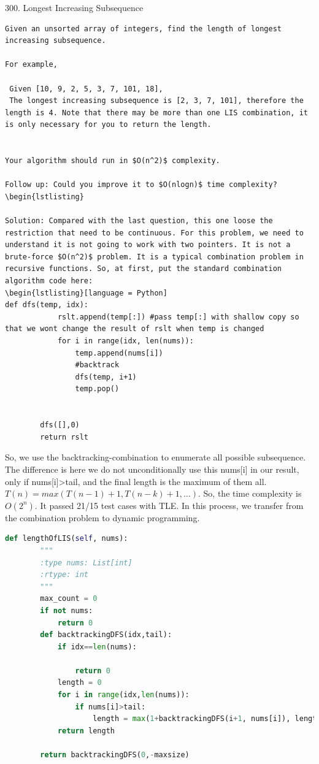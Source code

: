 \documentclass[../specific-algorithms.tex]{subfiles}
\begin{document}
300. Longest Increasing Subsequence
\begin{lstlisting}
Given an unsorted array of integers, find the length of longest increasing subsequence.

For example,

 Given [10, 9, 2, 5, 3, 7, 101, 18],
 The longest increasing subsequence is [2, 3, 7, 101], therefore the length is 4. Note that there may be more than one LIS combination, it is only necessary for you to return the length.


Your algorithm should run in $O(n^2)$ complexity.

Follow up: Could you improve it to $O(nlogn)$ time complexity?
\begin{lstlisting}

Solution: Compared with the last question, this one loose the restriction that need to be continuous. For this problem, we need to understand it is not going to work with two pointers. It is not a brute-force $O(n^2)$ problem. It is a typical combination problem in recursive functions. So, at first, put the standard combination algorithm code here:
\begin{lstlisting}[language = Python]
def dfs(temp, idx):
            rslt.append(temp[:]) #pass temp[:] with shallow copy so that we wont change the result of rslt when temp is changed
            for i in range(idx, len(nums)):
                temp.append(nums[i])
                #backtrack
                dfs(temp, i+1)
                temp.pop()
                
                
        dfs([],0)
        return rslt
\end{lstlisting}

So, we use the backtracking-combination to enumerate all possible subsequence. The difference is here we do not unconditionally use this nums[i] in our result, only if nums[i]>tail, and the final length is the maximum of them all. $T(n) = max(T(n-1)+1, T(n-k)+1, …)$. So, the time complexity is $O(2^n)$. It passed 21/15 test cases with TLE. In this process, we transfer from the combination problem to dynamic programming.
\begin{lstlisting}[language = Python]
def lengthOfLIS(self, nums):
        """
        :type nums: List[int]
        :rtype: int
        """
        max_count = 0
        if not nums:
            return 0
        def backtrackingDFS(idx,tail):
            if idx==len(nums):
                
                return 0
            length = 0
            for i in range(idx,len(nums)):
                if nums[i]>tail:
                    length = max(1+backtrackingDFS(i+1, nums[i]), length)
            return length
        
        return backtrackingDFS(0,-maxsize)
\end{lstlisting}
\end{document}
